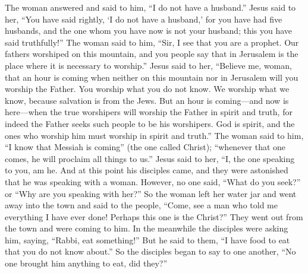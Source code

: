 \begin{biblechapter}
\verse The woman answered and said to him, “I do not have a husband.” Jesus said to her, “You have said rightly, ‘I do not have a husband,’
\verse for you have had five husbands, and the one whom you have now is not your husband; this you have said truthfully!”
\verse The woman said to him, “Sir, I see that you are a prophet.
\verse Our fathers worshiped on this mountain, and you people say that in Jerusalem is the place where it is necessary to worship.”
\verse Jesus said to her, “Believe me, woman, that an hour is coming when neither on this mountain nor in Jerusalem will you worship the Father.
\verse You worship what you do not know. We worship what we know, because salvation is from the Jews.
\verse But an hour is coming—and now is here—when the true worshipers will worship the Father in spirit and truth, for indeed the Father seeks such people to be his worshipers.
\verse God is spirit, and the ones who worship him must worship in spirit and truth.”
\verse The woman said to him, “I know that Messiah is coming” (the one called Christ); “whenever that one comes, he will proclaim all things to us.”
\verse Jesus said to her, “I, the one speaking to you, am he.
 And at this point his disciples came, and they were astonished that he was speaking with a woman. However, no one said, “What do you seek?” or “Why are you speaking with her?”
\verse So the woman left her water jar and went away into the town and said to the people,
\verse “Come, see a man who told me everything I have ever done! Perhaps this one is the Christ?”
\verse They went out from the town and were coming to him.
\verse In the meanwhile the disciples were asking him, saying, “Rabbi, eat something!”
\verse But he said to them, “I have food to eat that you do not know about.”
\verse So the disciples began to say to one another, “No one brought him anything to eat, did they?”

\end{biblechapter}
